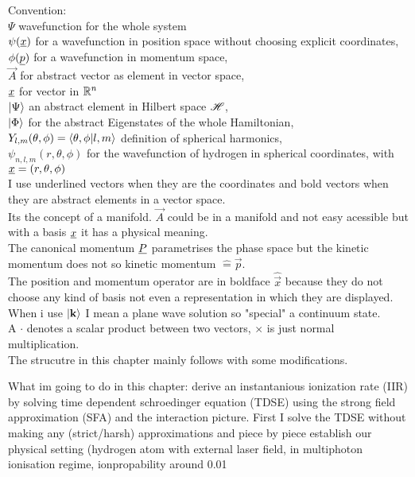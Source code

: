 Convention: \\
$\Psi$ wavefunction for the whole system  \\
$\psi(\underline{x})$ for a wavefunction in position space without choosing explicit coordinates, \\
$\phi(\underline{p})$  for a wavefunction in momentum space, \\
$\vec{A}$ for abstract vector as element in vector space, \\
$\underline{x}$ for vector in $\mathbb{R}^n$ \\
$\ket{\Psi}$ an abstract element in Hilbert space $\mathscr{H}$, \\
$\ket{\Phi}$ for the abstract Eigenstates of the whole Hamiltonian, \\
$Y_{l, m}(\theta, \phi) = \braket{\theta, \phi | l, m}$ definition of spherical harmonics, \\
$\psi_{n, l, m}(r, \theta, \phi)$ for the wavefunction of hydrogen in spherical coordinates, with $\underline{x}=(r, \theta, \phi)$ \\
I use underlined vectors when they are the coordinates and bold vectors when they are abstract elements in a vector space. \\
Its the concept of a manifold. $\vec{A}$ could be in a manifold and not easy acessible but with a basis $\underline{x}$ it has a physical meaning.\\
The canonical momentum $\underline{P}$ parametrises the phase space but the kinetic momentum does not so kinetic momentum $\hat{=} \vec{p}$.\\
The position and momentum operator are in boldface $\hat{\vec{x}}$ because they do not choose any kind of basis not even a representation in which they are displayed.\\
When i use $\ket{\mathbf{k}}$ I mean a plane wave solution so "special" a continuum state.\\
A $\cdot$ denotes a scalar product between two vectors, $\times$ is just normal multiplication. \\


The strucutre in this chapter mainly follows \cite{Ivanov20012005} with some modifications.

What im going to do in this chapter: derive an instantanious ionization rate (IIR) by solving time dependent schroedinger equation (TDSE) using the strong field approximation (SFA) and the interaction picture.
First I solve the TDSE without making any (strict/harsh) approximations and piece by piece establish our physical setting (hydrogen atom with external laser field, in multiphoton ionisation regime, ionpropability around 0.01%

